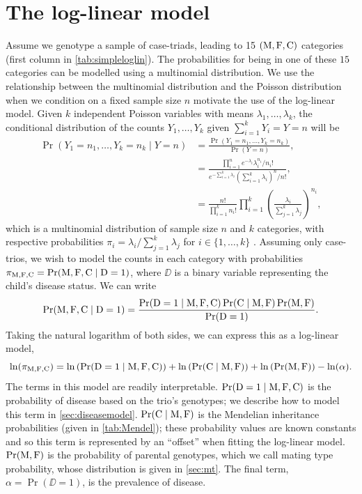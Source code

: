 \section{The log-linear model} \label{sec:loglin}

Assume we genotype a sample of case-triads, leading to 15 $({\rm M}, {\rm F}, {\rm C})$ categories (first column in \cref{tab:simpleloglin}).
The probabilities for being in one of these $15$ categories can be modelled using a multinomial distribution.
We use the relationship between the multinomial distribution and the Poisson distribution when we condition on a fixed sample size $n$ motivate the use of the log-linear model.
Given $k$ independent Poisson variables with means $\lambda_1, \ldots, \lambda_k$, the conditional distribution of the counts $Y_1, \ldots, Y_k$ given $\sum_{i=1}^k Y_i = Y = n$ will be
\begin{align*}
    \Pr(Y_1 = n_1, \ldots, Y_k = n_k \mid Y = n) &= \frac{\Pr(Y_1 = n_1, \ldots, Y_k = n_k)}{\Pr(Y = n)}, \\
                                                   &= \frac{\prod_{i = 1}^n e^{-\lambda_i}\lambda_i^{n_i}/n_i!}{e^{-\sum_{i=1}^k \lambda_i}\left(\sum_{i=1}^k \lambda_i\right)^n/n!}, \\
                                                   &= \frac{n!}{\prod_{i=1}^k n_i!} \prod_{i=1}^k \left(\frac{\lambda_i}{\sum_{j=1}^k \lambda_j}\right)^{n_i},
\end{align*}
which is a multinomial distribution of sample size $n$ and $k$ categories, with respective probabilities $\pi_i = \lambda_i / \sum_{j=1}^k \lambda_j$ for $i \in \{1, \ldots, k\}$ \cite{Huds19}.
Assuming only case-trios, we wish to model the counts in each category with probabilities $\pi_{{\rm M}, {\rm F}, {\rm C}} = \Pr({\rm M}, {\rm F}, {\rm C} \mid {\rm D} = 1)$, where $\DD$ is a binary variable representing the child's disease status.
We can write
\begin{equation}\label{eq:bayes}
    \Pr({\rm M}, {\rm F}, {\rm C} \mid {\rm D} = 1) = \frac{\Pr({\rm D} = 1 \mid {\rm M}, {\rm F}, {\rm C}) \Pr({\rm C} \mid {\rm M}, {\rm F}) \Pr({\rm M}, {\rm F})}{\Pr({\rm D} = 1)}.
\end{equation}
Taking the natural logarithm of both sides, we can express this as a log-linear model,
\begin{equation}\label{eq:loglin}
    \ln(\pi_{{\rm M}, {\rm F}, {\rm C}}) = \ln\left(\Pr({\rm D} = 1 \mid {\rm M}, {\rm F}, {\rm C})\right) + \ln\left(\Pr({\rm C} \mid {\rm M}, {\rm F})\right) + \ln\left(\Pr({\rm M}, {\rm F})\right) - \ln(\alpha).
\end{equation}
The terms in this model are readily interpretable.
$\Pr({\rm D} = 1 \mid {\rm M}, {\rm F}, {\rm C})$ is the probability of disease based on the trio's genotypes; we describe how to model this term in \cref{sec:diseasemodel}.
$\Pr({\rm C} \mid {\rm M}, {\rm F})$ is the Mendelian inheritance probabilities (given in \cref{tab:Mendel}); these probability values are known constants and so this term is represented by an ``offset'' when fitting the log-linear model.
$\Pr({\rm M}, {\rm F})$ is the probability of parental genotypes, which we call mating type probability, whose distribution is given in \cref{sec:mt}.
The final term, $\alpha = \Pr(\DD = 1)$, is the prevalence of disease.

